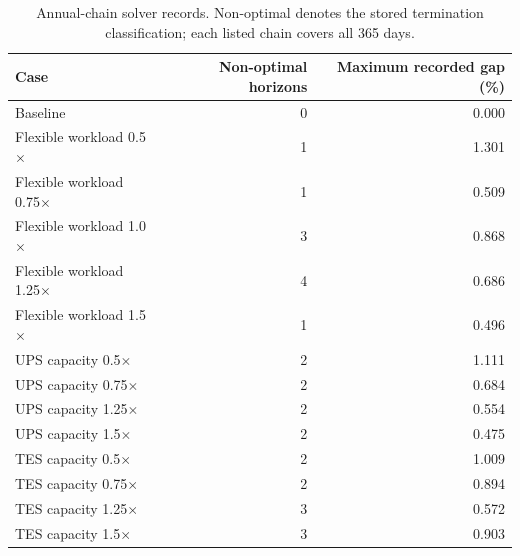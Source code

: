 \begin{table}[htbp]
\centering\small
\caption{Annual-chain solver records. Non-optimal denotes the stored termination classification; each listed chain covers all 365 days.}\label{tab:solver-quality}
\begin{tabular}{@{}lrr@{}}\toprule
Case & Non-optimal horizons & Maximum recorded gap (\%) \\\midrule
Baseline & 0 & 0.000 \\
Flexible workload 0.5$\times$ & 1 & 1.301 \\
Flexible workload 0.75$\times$ & 1 & 0.509 \\
Flexible workload 1.0$\times$ & 3 & 0.868 \\
Flexible workload 1.25$\times$ & 4 & 0.686 \\
Flexible workload 1.5$\times$ & 1 & 0.496 \\
UPS capacity 0.5$\times$ & 2 & 1.111 \\
UPS capacity 0.75$\times$ & 2 & 0.684 \\
UPS capacity 1.25$\times$ & 2 & 0.554 \\
UPS capacity 1.5$\times$ & 2 & 0.475 \\
TES capacity 0.5$\times$ & 2 & 1.009 \\
TES capacity 0.75$\times$ & 2 & 0.894 \\
TES capacity 1.25$\times$ & 3 & 0.572 \\
TES capacity 1.5$\times$ & 3 & 0.903 \\
\bottomrule\end{tabular}
\end{table}
